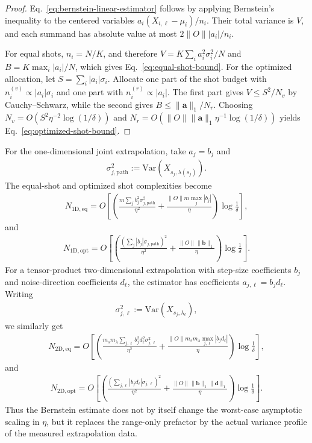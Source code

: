 \documentclass[aps,pra,reprint,groupedaddress,floatfix]{revtex4-2}
\begin{document}
\begin{proof}
Eq.~\eqref{eq:bernstein-linear-estimator} follows by applying Bernstein's inequality to the centered variables $a_i(X_{i,\ell}-\mu_i)/n_i$. Their total variance is $V$, and each summand has absolute value at most $2\|O\||a_i|/n_i$.

For equal shots, $n_i=N/K$, and therefore $V=K\sum_i a_i^2\sigma_i^2/N$ and $B=K\max_i|a_i|/N$, which gives Eq.~\eqref{eq:equal-shot-bound}. For the optimized allocation, let $S=\sum_i |a_i|\sigma_i$. Allocate one part of the shot budget with $n_i^{(v)}\propto |a_i|\sigma_i$ and one part with $n_i^{(r)}\propto |a_i|$. The first part gives $V\le S^2/N_v$ by Cauchy--Schwarz, while the second gives $B\le \|\mathbf a\|_1/N_r$. Choosing $N_v=O(S^2\eta^{-2}\log(1/\delta))$ and $N_r=O(\|O\|\|\mathbf a\|_1\eta^{-1}\log(1/\delta))$ yields Eq.~\eqref{eq:optimized-shot-bound}.
\end{proof}

For the one-dimensional joint extrapolation, take $a_j=b_j$ and
\begin{align*}
    \sigma_{j,\mathrm{path}}^2
    :=
    \mathrm{Var}\!\left(X_{s_j,\lambda(s_j)}\right).
\end{align*}
The equal-shot and optimized shot complexities become
\begin{align}
\label{eq:1d-equal-shot}
    N_{\mathrm{1D,eq}}
    =
    O\left[
    \left(
    \frac{m\sum_j b_j^2\sigma_{j,\mathrm{path}}^2}{\eta^2}
    +
    \frac{\|O\|m\max_j|b_j|}{\eta}
    \right)
    \log\frac{1}{\delta}
    \right],
\end{align}
and
\begin{align}
\label{eq:1d-opt-shot}
    N_{\mathrm{1D,opt}}
    =
    O\left[
    \left(
    \frac{\left(\sum_j |b_j|\sigma_{j,\mathrm{path}}\right)^2}{\eta^2}
    +
    \frac{\|O\|\|\mathbf b\|_1}{\eta}
    \right)
    \log\frac{1}{\delta}
    \right].
\end{align}
For a tensor-product two-dimensional extrapolation with step-size coefficients $b_j$ and noise-direction coefficients $d_\ell$, the estimator has coefficients $a_{j,\ell}=b_jd_\ell$. Writing
\begin{align*}
    \sigma_{j,\ell}^2
    :=
    \mathrm{Var}\!\left(X_{s_j,\lambda_\ell}\right),
\end{align*}
we similarly get
\begin{align}
\label{eq:2d-equal-shot}
    N_{\mathrm{2D,eq}}
    =
    O\left[
    \left(
    \frac{m_sm_\lambda\sum_{j,\ell} b_j^2d_\ell^2\sigma_{j,\ell}^2}{\eta^2}
    +
    \frac{\|O\|m_sm_\lambda\max_{j,\ell}|b_jd_\ell|}{\eta}
    \right)
    \log\frac{1}{\delta}
    \right],
\end{align}
and
\begin{align}
\label{eq:2d-opt-shot}
    N_{\mathrm{2D,opt}}
    =
    O\left[
    \left(
    \frac{\left(\sum_{j,\ell}|b_jd_\ell|\sigma_{j,\ell}\right)^2}{\eta^2}
    +
    \frac{\|O\|\|\mathbf b\|_1\|\mathbf d\|_1}{\eta}
    \right)
    \log\frac{1}{\delta}
    \right].
\end{align}
Thus the Bernstein estimate does not by itself change the worst-case asymptotic scaling in $\eta$, but it replaces the range-only prefactor by the actual variance profile of the measured extrapolation data.
\end{document}
